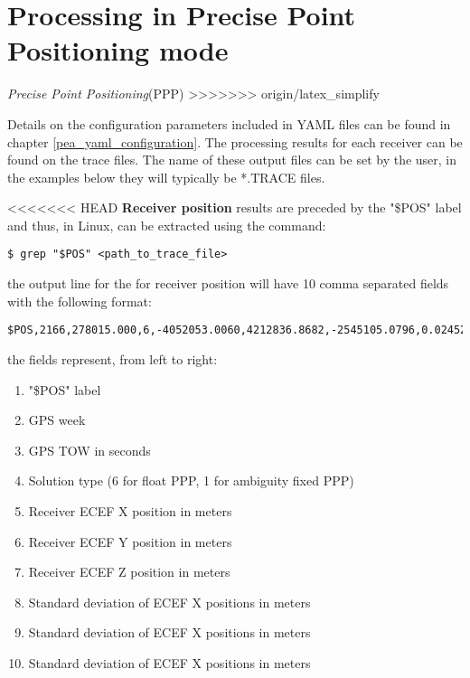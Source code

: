\chapter{Processing in Precise Point Positioning mode}

\textit{Precise Point Positioning}(PPP)
>>>>>>> origin/latex_simplify

Details on the configuration parameters included in YAML files can be found in chapter \ref{pea_yaml_configuration}. The processing results for each receiver can be found on the trace files. The name of these output files can be set by the user, in the examples below they will typically be *.TRACE files.

<<<<<<< HEAD
\textbf{Receiver position}  results are preceded by the "\$POS" label and thus, in Linux, can be extracted using the command:
 \begin{verbatim}
$ grep "$POS" <path_to_trace_file>
\end{verbatim}
the output line for the for receiver position will have 10 comma separated fields with the following format:
\begin{verbatim}
$POS,2166,278015.000,6,-4052053.0060,4212836.8682,-2545105.0796,0.0245227,0.0231919,0.0163678
\end{verbatim}
the fields represent, from left to right:
\begin{enumerate}
	\item  "\$POS" label
	\item  GPS week
	\item  GPS TOW in seconds
	\item  Solution type (6 for float PPP, 1 for ambiguity fixed PPP)
	\item  Receiver ECEF X position in meters
	\item  Receiver ECEF Y position in meters
	\item  Receiver ECEF Z position in meters
	\item  Standard deviation of ECEF X positions in meters
	\item  Standard deviation of ECEF X positions in meters
	\item  Standard deviation of ECEF X positions in meters
\end{enumerate}

